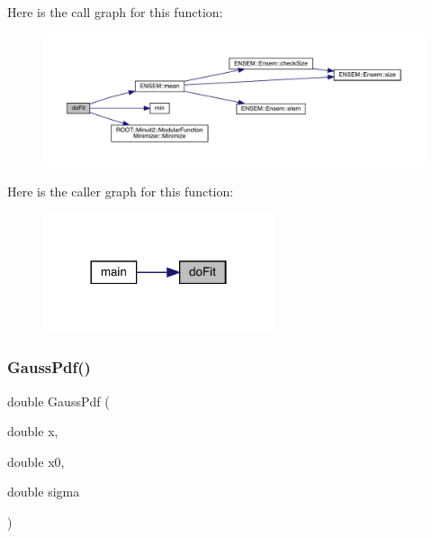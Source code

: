 Here is the call graph for this function\+:
\nopagebreak
\begin{figure}[H]
\begin{center}
\leavevmode
\includegraphics[width=350pt]{d7/df1/adat-devel_2other__libs_2minuit_2test_2MnSim_2ParallelTest_8cxx_ad2424cde5fec20b83f95e54a5f134ad6_cgraph}
\end{center}
\end{figure}
Here is the caller graph for this function\+:
\nopagebreak
\begin{figure}[H]
\begin{center}
\leavevmode
\includegraphics[width=192pt]{d7/df1/adat-devel_2other__libs_2minuit_2test_2MnSim_2ParallelTest_8cxx_ad2424cde5fec20b83f95e54a5f134ad6_icgraph}
\end{center}
\end{figure}
\mbox{\label{adat-devel_2other__libs_2minuit_2test_2MnSim_2ParallelTest_8cxx_a8d06db116c17441efc94ec186e960754}} 
\subsubsection{\texorpdfstring{GaussPdf()}{GaussPdf()}}
{\footnotesize\ttfamily double Gauss\+Pdf (\begin{DoxyParamCaption}\item[{double}]{x,  }\item[{double}]{x0,  }\item[{double}]{sigma }\end{DoxyParamCaption})}

